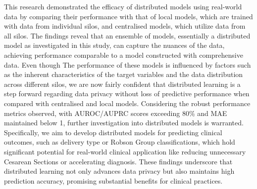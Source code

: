 
This research demonstrated the efficacy of distributed models using real-world data by comparing their performance with that of local models, which are trained with data from individual silos, and centralised models, which utilize data from all silos. The findings reveal that an ensemble of models, essentially a distributed model as investigated in this study, can capture the nuances of the data, achieving performance comparable to a model constructed with comprehensive data. Even though The performance of these models is influenced by factors such as the inherent characteristics of the target variables and the data distribution across different silos, we are now fairly confident that distributed learning is a step forward regarding data privacy without loss of predictive performance when compared with centralised and local models.
Considering the robust performance metrics observed, with AUROC/AUPRC scores exceeding 80\% and MAE maintained below 1, further investigation into distributed models is warranted. Specifically, we aim to develop distributed models for predicting clinical outcomes, such as delivery type or Robson Group classifications, which hold significant potential for real-world clinical application like reducing unnecessary Cesarean Sections or accelerating diagnosis. These findings underscore that distributed learning not only advances data privacy but also maintains high prediction accuracy, promising substantial benefits for clinical practices.
